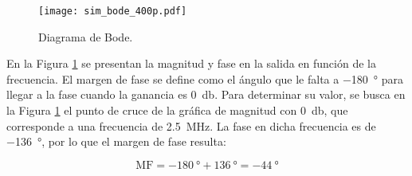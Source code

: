 
\begin{figure}[H]
	\centering
	\texttt{[image: sim\_bode\_400p.pdf]}
	\caption{Diagrama de Bode.}
	\label{fig:sim_bode}
\end{figure}

En la Figura \ref{fig:sim_bode} se presentan la magnitud y fase en la salida en función de la frecuencia.
El margen de fase se define como el ángulo que le falta a \SI{-180}{\degree} para llegar a la fase cuando la ganancia es \SI{0}{\decibel}. Para determinar su valor, se busca en la Figura \ref{fig:sim_bode} el punto de cruce de la gráfica de magnitud con \SI{0}{\decibel}, que corresponde a una frecuencia de \SI{2.5}{\mega\hertz}. La fase en dicha frecuencia es de \SI{-136}{\degree}, por lo que el margen de fase resulta:

	$$ \mathrm{MF} = \SI{-180}{\degree} + \SI{136}{\degree} = \boxed{\SI{-44}{\degree}} $$